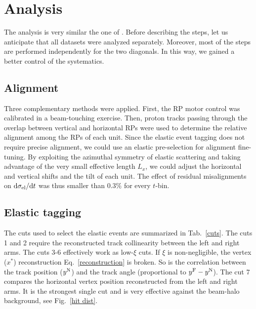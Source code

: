 \documentclass[doublecol]{../macros/epl2}
\def\d{{\rm d}}
\begin{document}
\section{Analysis}

The analysis is very similar the one of \cite{epl96}. Before describing the steps, let us anticipate that all datasets were analyzed separately. Moreover, most of the steps are performed independently for the two diagonals. In this way, we gained a better control of the systematics.

\subsection{Alignment}

Three complementary methods were applied. First, the RP motor control was calibrated in a beam-touching exercise. Then, proton tracks passing through the overlap between vertical and horizontal RPs were used to determine the relative alignment among the RPs of each unit. Since the elastic event tagging does not require precise alignment, we could use an elastic pre-selection for alignment fine-tuning. By exploiting the azimuthal symmetry of elastic scattering and taking advantage of the very small effective length $L_x$, we could adjust the horizontal and vertical shifts and the tilt of each unit. The effect of residual misalignments on $\d\sigma_{\rm el}/\d t$ was thus smaller than $0.3\%$ for every $t$-bin.

\subsection{Elastic tagging}

The cuts used to select the elastic events are summarized in Tab.~\ref{cuts}. The cuts 1 and 2 require the reconstructed track collinearity between the left and right arms. The cuts 3-6 effectively work as low-$\xi$ cuts. If $\xi$ is non-negligible, the vertex ($x^*$) reconstruction Eq.~\ref{reconstruction} is broken. So is the correlation between the track position ($y^{\rm N}$) and the track angle (proportional to $y^{\rm F} - y^{\rm N}$). The cut 7 compares the horizontal vertex position reconstructed from the left and right arms. It is the strongest single cut and is very effective against the beam-halo background, see Fig.~\ref{hit dist}.
\end{document}
